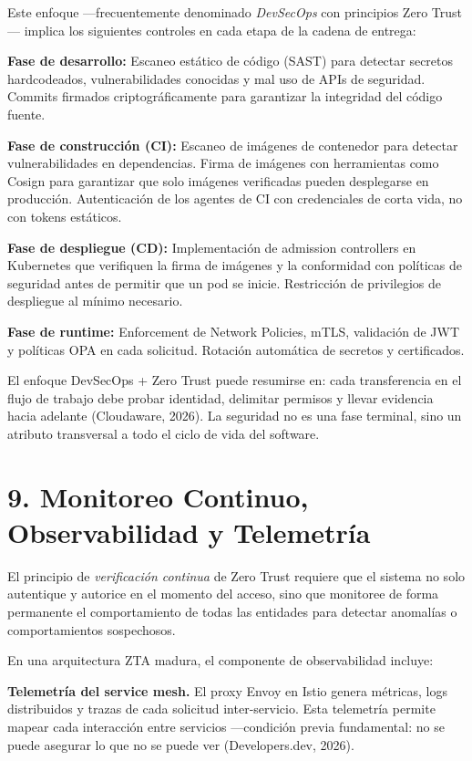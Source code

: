\documentclass[12pt,a4paper]{article}
\begin{document}
Este enfoque —frecuentemente denominado \textit{DevSecOps} con principios Zero Trust— implica los siguientes controles en cada etapa de la cadena de entrega:

\textbf{Fase de desarrollo:} Escaneo estático de código (SAST) para detectar secretos hardcodeados, vulnerabilidades conocidas y mal uso de APIs de seguridad. Commits firmados criptográficamente para garantizar la integridad del código fuente.

\textbf{Fase de construcción (CI):} Escaneo de imágenes de contenedor para detectar vulnerabilidades en dependencias. Firma de imágenes con herramientas como Cosign para garantizar que solo imágenes verificadas pueden desplegarse en producción. Autenticación de los agentes de CI con credenciales de corta vida, no con tokens estáticos.

\textbf{Fase de despliegue (CD):} Implementación de admission controllers en Kubernetes que verifiquen la firma de imágenes y la conformidad con políticas de seguridad antes de permitir que un pod se inicie. Restricción de privilegios de despliegue al mínimo necesario.

\textbf{Fase de runtime:} Enforcement de Network Policies, mTLS, validación de JWT y políticas OPA en cada solicitud. Rotación automática de secretos y certificados.

El enfoque DevSecOps + Zero Trust puede resumirse en: cada transferencia en el flujo de trabajo debe probar identidad, delimitar permisos y llevar evidencia hacia adelante (Cloudaware, 2026). La seguridad no es una fase terminal, sino un atributo transversal a todo el ciclo de vida del software.



\section{9. Monitoreo Continuo, Observabilidad y Telemetría}

El principio de \textit{verificación continua} de Zero Trust requiere que el sistema no solo autentique y autorice en el momento del acceso, sino que monitoree de forma permanente el comportamiento de todas las entidades para detectar anomalías o comportamientos sospechosos.

En una arquitectura ZTA madura, el componente de observabilidad incluye:

\textbf{Telemetría del service mesh.} El proxy Envoy en Istio genera métricas, logs distribuidos y trazas de cada solicitud inter-servicio. Esta telemetría permite mapear cada interacción entre servicios —condición previa fundamental: no se puede asegurar lo que no se puede ver (Developers.dev, 2026).
\end{document}
